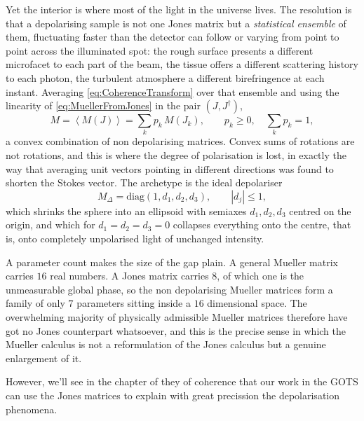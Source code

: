             Yet the interior is where most of the light in the universe lives. The resolution is that a depolarising sample is not one Jones matrix but a \textit{statistical ensemble} of them, fluctuating faster than the detector can follow or varying from point to point across the illuminated spot: the rough surface presents a different microfacet to each part of the beam, the tissue offers a different scattering history to each photon, the turbulent atmosphere a different birefringence at each instant. Averaging \ref{eq:CoherenceTransform} over that ensemble and using the linearity of \ref{eq:MuellerFromJones} in the pair $(J,J^{\dagger})$,
            \begin{equation}\label{eq:MuellerEnsemble}
                M = \left\langle M\left(J\right)\right\rangle = \sum_k p_k\,M\left(J_k\right), \qquad p_k\geq0, \quad \sum_kp_k=1 ,
            \end{equation}
            a convex combination of non depolarising matrices. Convex sums of rotations are not rotations, and this is where the degree of polarisation is lost, in exactly the way that averaging unit vectors pointing in different directions was found to shorten the Stokes vector. The archetype is the ideal depolariser
            \begin{equation}\label{eq:MuellerDepolariser}
                M_\Delta = \text{diag}\left(1,d_1,d_2,d_3\right), \qquad \left|d_j\right|\leq1 ,
            \end{equation}
            which shrinks the sphere into an ellipsoid with semiaxes $d_1,d_2,d_3$ centred on the origin, and which for $d_1=d_2=d_3=0$ collapses everything onto the centre, that is, onto completely unpolarised light of unchanged intensity.

            A parameter count makes the size of the gap plain. A general Mueller matrix carries $16$ real numbers. A Jones matrix carries $8$, of which one is the unmeasurable global phase, so the non depolarising Mueller matrices form a family of only $7$ parameters sitting inside a $16$ dimensional space. The overwhelming majority of physically admissible Mueller matrices therefore have got no Jones counterpart whatsoever, and this is the precise sense in which the Mueller calculus is not a reformulation of the Jones calculus but a genuine enlargement of it.

            However, we'll see in the chapter of they of coherence that our work in the GOTS can use the Jones matrices to explain with great precission the depolarisation phenomena. 

